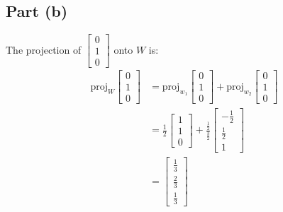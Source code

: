 \documentclass{article}
\begin{document}
\subsection*{Part (b)}
The projection of $\begin{bmatrix} 0 \\ 1 \\ 0 \end{bmatrix}$ onto $W$ is:
\begin{equation}
    \begin{split}
        \mathrm{proj}_W \begin{bmatrix}
            0 \\ 1 \\ 0
        \end{bmatrix} & = \mathrm{proj}_{w_1} \begin{bmatrix}
            0 \\ 1 \\ 0
        \end{bmatrix} + \mathrm{proj}_{w_2} \begin{bmatrix}
            0 \\ 1 \\ 0
        \end{bmatrix} \\
        & = \frac{1}{2}\begin{bmatrix}1 \\ 1 \\ 0\end{bmatrix} + \frac{\frac{1}{2}}{\frac{3}{2}}\begin{bmatrix}-\frac{1}{2} \\ \frac{1}{2} \\ 1\end{bmatrix} \\
        & = \begin{bmatrix}\frac{1}{3} \\ \frac{2}{3} \\ \frac{1}{3}\end{bmatrix}
    \end{split}
\end{equation}
\end{document}
